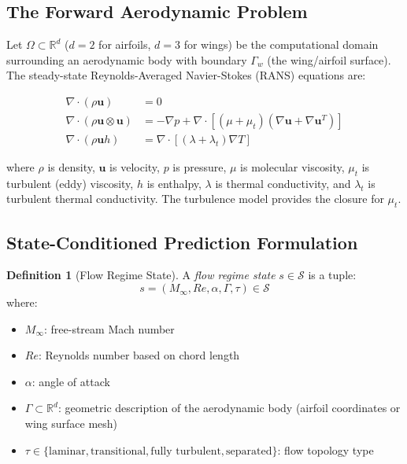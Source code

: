 \documentclass[11pt,a4paper]{article}
\theoremstyle{definition}
\newtheorem{definition}[theorem]{Definition}
\theoremstyle{remark}
\newcommand{\R}{\mathbb{R}}
\begin{document}
\subsection{The Forward Aerodynamic Problem}

Let $\Omega \subset \R^d$ ($d=2$ for airfoils, $d=3$ for wings) be the computational domain surrounding an aerodynamic body with boundary $\Gamma_w$ (the wing/airfoil surface).
The steady-state Reynolds-Averaged Navier-Stokes (RANS) equations are:

\begin{equation}
\begin{aligned}
\nabla \cdot (\rho \mathbf{u}) &= 0 \\
\nabla \cdot (\rho \mathbf{u} \otimes \mathbf{u}) &= -\nabla p + \nabla \cdot \left[ (\mu + \mu_t)(\nabla \mathbf{u} + \nabla \mathbf{u}^T) \right] \\
\nabla \cdot (\rho \mathbf{u} h) &= \nabla \cdot \left[ (\lambda + \lambda_t) \nabla T \right]
\end{aligned}
\label{eq:rans}
\end{equation}

\noindent where $\rho$ is density, $\mathbf{u}$ is velocity, $p$ is pressure, $\mu$ is molecular viscosity, $\mu_t$ is turbulent (eddy) viscosity, $h$ is enthalpy, $\lambda$ is thermal conductivity, and $\lambda_t$ is turbulent thermal conductivity.
The turbulence model provides the closure for $\mu_t$.

\subsection{State-Conditioned Prediction Formulation}

\begin{definition}[Flow Regime State]
A \emph{flow regime state} $s \in \mathcal{S}$ is a tuple:
\begin{equation}
s = (M_\infty, Re, \alpha, \Gamma, \tau) \in \mathcal{S}
\label{eq:state}
\end{equation}
\noindent where:
\begin{itemize}[nosep]
    \item $M_\infty$: free-stream Mach number
    \item $Re$: Reynolds number based on chord length
    \item $\alpha$: angle of attack
    \item $\Gamma \subset \R^d$: geometric description of the aerodynamic body (airfoil coordinates or wing surface mesh)
    \item $\tau \in \{\text{laminar}, \text{transitional}, \text{fully turbulent}, \text{separated}\}$: flow topology type
\end{itemize}
\end{definition}
\end{document}
